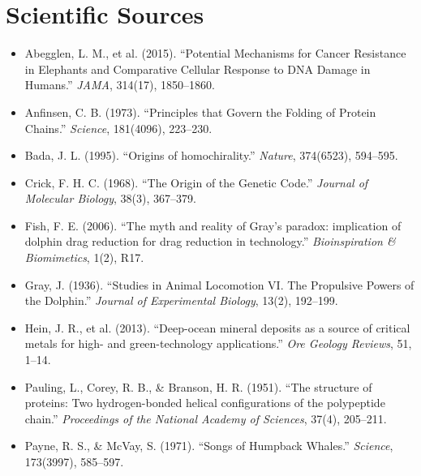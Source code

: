 \documentclass[11pt, letterpaper, openany]{book}
\begin{document}
\section*{Scientific Sources}

\begin{itemize}

    \item Abegglen, L. M., et al. (2015). “Potential Mechanisms for Cancer Resistance in Elephants and Comparative Cellular Response to DNA Damage in Humans.” \textit{JAMA}, 314(17), 1850–1860.

    \item Anfinsen, C. B. (1973). “Principles that Govern the Folding of Protein Chains.” \textit{Science}, 181(4096), 223–230.

    \item Bada, J. L. (1995). “Origins of homochirality.” \textit{Nature}, 374(6523), 594–595.

    \item Crick, F. H. C. (1968). “The Origin of the Genetic Code.” \textit{Journal of Molecular Biology}, 38(3), 367–379.

    \item Fish, F. E. (2006). “The myth and reality of Gray's paradox: implication of dolphin drag reduction for drag reduction in technology.” \textit{Bioinspiration \& Biomimetics}, 1(2), R17.

    \item Gray, J. (1936). “Studies in Animal Locomotion VI. The Propulsive Powers of the Dolphin.” \textit{Journal of Experimental Biology}, 13(2), 192–199.

    \item Hein, J. R., et al. (2013). “Deep-ocean mineral deposits as a source of critical metals for high- and green-technology applications.” \textit{Ore Geology Reviews}, 51, 1–14.

    \item Pauling, L., Corey, R. B., \& Branson, H. R. (1951). “The structure of proteins: Two hydrogen-bonded helical configurations of the polypeptide chain.” \textit{Proceedings of the National Academy of Sciences}, 37(4), 205–211.

    \item Payne, R. S., \& McVay, S. (1971). “Songs of Humpback Whales.” \textit{Science}, 173(3997), 585–597.


\end{itemize}
\end{document}
